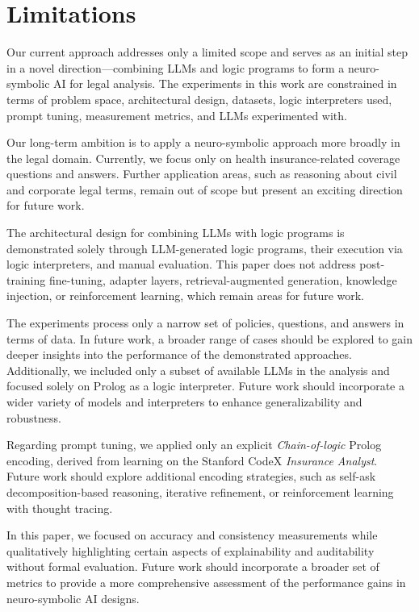 \section{Limitations}

Our current approach addresses only a limited scope and serves as an initial step in a novel direction—combining LLMs and logic programs to form a neuro-symbolic AI for legal analysis. The experiments in this work are constrained in terms of problem space, architectural design, datasets, logic interpreters used, prompt tuning, measurement metrics, and LLMs experimented with.

Our long-term ambition is to apply a neuro-symbolic approach more broadly in the legal domain. Currently, we focus only on health insurance-related coverage questions and answers. Further application areas, such as reasoning about civil and corporate legal terms, remain out of scope but present an exciting direction for future work.

The architectural design for combining LLMs with logic programs is demonstrated solely through LLM-generated logic programs, their execution via logic interpreters, and manual evaluation. This paper does not address post-training fine-tuning, adapter layers, retrieval-augmented generation, knowledge injection, or reinforcement learning, which remain areas for future work.

The experiments process only a narrow set of policies, questions, and answers in terms of data. In future work, a broader range of cases should be explored to gain deeper insights into the performance of the demonstrated approaches. Additionally, we included only a subset of available LLMs in the analysis and focused solely on Prolog as a logic interpreter. Future work should incorporate a wider variety of models and interpreters to enhance generalizability and robustness.

Regarding prompt tuning, we applied only an explicit \textit{Chain-of-logic} Prolog encoding, derived from learning on the Stanford CodeX \textit{Insurance Analyst}. Future work should explore additional encoding strategies, such as self-ask decomposition-based reasoning, iterative refinement, or reinforcement learning with thought tracing.

In this paper, we focused on accuracy and consistency measurements while qualitatively highlighting certain aspects of explainability and auditability without formal evaluation. Future work should incorporate a broader set of metrics to provide a more comprehensive assessment of the performance gains in neuro-symbolic AI designs.